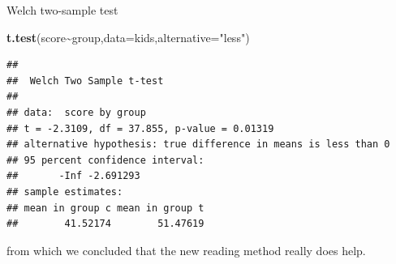 \documentclass[
  ignorenonframetext,
]{beamer}
\newenvironment{Shaded}{\begin{snugshade}}{\end{snugshade}}
\newcommand{\DataTypeTok}[1]{\textcolor[rgb]{0.13,0.29,0.53}{#1}}
\newcommand{\KeywordTok}[1]{\textcolor[rgb]{0.13,0.29,0.53}{\textbf{#1}}}
\newcommand{\NormalTok}[1]{#1}
\newcommand{\OperatorTok}[1]{\textcolor[rgb]{0.81,0.36,0.00}{\textbf{#1}}}
\newcommand{\StringTok}[1]{\textcolor[rgb]{0.31,0.60,0.02}{#1}}
\begin{document}
\begin{frame}[fragile]{Welch two-sample test}
\protect\hypertarget{welch-two-sample-test}{}
\begin{Shaded}
\begin{Highlighting}[]
\KeywordTok{t.test}\NormalTok{(score}\OperatorTok{\textasciitilde{}}\NormalTok{group,}\DataTypeTok{data=}\NormalTok{kids,}\DataTypeTok{alternative=}\StringTok{"less"}\NormalTok{)}
\end{Highlighting}
\end{Shaded}

\begin{verbatim}
## 
##  Welch Two Sample t-test
## 
## data:  score by group
## t = -2.3109, df = 37.855, p-value = 0.01319
## alternative hypothesis: true difference in means is less than 0
## 95 percent confidence interval:
##       -Inf -2.691293
## sample estimates:
## mean in group c mean in group t 
##        41.52174        51.47619
\end{verbatim}

from which we concluded that the new reading method really does help.
\end{frame}
\end{document}
